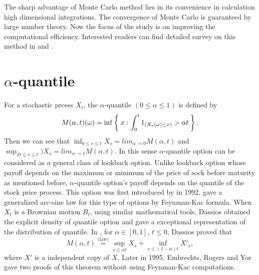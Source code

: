 \documentclass[12pt,oneside,titlepage]{book}
\def\eqlaw{{\stackrel{\text{(law)}}{=}}}
\begin{document}
The sharp advantage of Monte Carlo method lies in its convenience in calculation high dimensional integrations. 
The convergence of Monte Carlo is guaranteed by large number theory. Now the focus of the study is on improving the  computational efficiency. Interested readers can find detailed survey on this method in \cite{Boyle1997} and \cite{Glasserman2004}. 



\chapter{$\alpha$-quantile}
For a stochastic prcess $X_t$,
the $\alpha$-quantile $( 0 \leq \alpha \leq 1)$
is defined by
\[
M(\alpha,t)(\omega) = \inf\Set{x:\int_0^t 1_{(X_s (\omega)\leq x)} > \alpha t}.
\]
Then we can see that $\inf_{0\leq s \leq t}  X_s = lim_{\alpha\to 0}M(\alpha,t)$ and $\sup_{(0\leq s \leq t})  X_s = lim_{\alpha\to 1} M(\alpha, t)$. In this sense $\alpha$-quantile option can be considered as a general class of lookback option. Unlike lookback option whose payoff depends on the maximum or minimum of the price of sock before maturity as mentioned before, $\alpha$-quantile option's payoff depends on the quantile of the stock price process. This option was first introduced by \cite{Miura} in 1992. \cite{Akahori1995} gave a generalized arc-sine law for this type of options by Feynman-Kac formula.
When $X_{t}$ is a Brownian motion $B_t$, using similar mathematical tools, Dassios obtained the explicit density of quantile option and gave a exceptional representation of the distribution of quantile.  In \cite{Dassios1995}, for $\alpha\in[0,1]$, $t\leq 0$, Dassios proved that
\begin{equation}\label{eq:Dassios}
M(\alpha, t) \eqlaw \sup_{s \leq \alpha t} X_s + \inf_{s\leq (1-\alpha)t} X'_s ,
\end{equation}
where $X'$ is a independent copy of $X$. Later in 1995, Embrechts, Rogers and Yor \cite{EmRoge1995} gave two proofs of this theorem without using Feynman-Kac computations.
\end{document}
